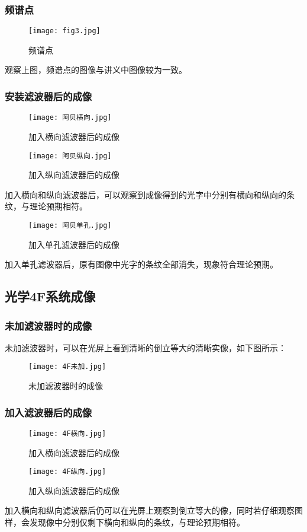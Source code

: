 \documentclass[UTF-8,twoside,cs4size]{ctexart}
\begin{document}
\subsubsection{频谱点}
\begin{figure}[!h]
    \centering
    \texttt{[image: fig3.jpg]}
    \caption{频谱点}
\end{figure} 
观察上图，频谱点的图像与讲义中图像较为一致。
\subsubsection{安装滤波器后的成像}
\begin{figure}[!h]
    \centering
    \texttt{[image: 阿贝横向.jpg]}
    \caption{加入横向滤波器后的成像}
\end{figure}
\begin{figure}[!h]
    \centering
    \texttt{[image: 阿贝纵向.jpg]}
    \caption{加入纵向滤波器后的成像}
\end{figure}
\newpage
加入横向和纵向滤波器后，可以观察到成像得到的光字中分别有横向和纵向的条纹，与理论预期相符。
\begin{figure}[!h]
    \centering
    \texttt{[image: 阿贝单孔.jpg]}
    \caption{加入单孔滤波器后的成像}
\end{figure}
加入单孔滤波器后，原有图像中光字的条纹全部消失，现象符合理论预期。

\subsection{光学4F系统成像}
\subsubsection{未加滤波器时的成像}
未加滤波器时，可以在光屏上看到清晰的倒立等大的清晰实像，如下图所示：
\newpage
\begin{figure}[!h]
    \centering
    \texttt{[image: 4F未加.jpg]}
    \caption{未加滤波器时的成像}
\end{figure}
\subsubsection{加入滤波器后的成像}
\newpage
\begin{figure}[!h]
    \centering
    \texttt{[image: 4F横向.jpg]}
    \caption{加入横向滤波器后的成像}
\end{figure}
\begin{figure}[!h]
    \centering
    \texttt{[image: 4F纵向.jpg]}
    \caption{加入纵向滤波器后的成像}
\end{figure}
加入横向和纵向滤波器后仍可以在光屏上观察到倒立等大的像，同时若仔细观察图样，会发现像中分别仅剩下横向和纵向的条纹，与理论预期相符。
\end{document}
